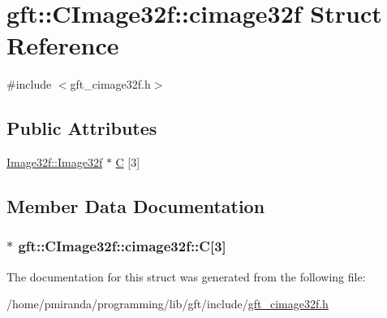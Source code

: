 \hypertarget{structgft_1_1CImage32f_1_1cimage32f}{}\section{gft\+:\+:C\+Image32f\+:\+:cimage32f Struct Reference}
\label{structgft_1_1CImage32f_1_1cimage32f}


{\ttfamily \#include $<$gft\+\_\+cimage32f.\+h$>$}

\subsection*{Public Attributes}
\begin{DoxyCompactItemize}
\item 
\hyperlink{namespacegft_1_1Image32f_a96206182c5fd3de436dfb4f87a1b49de}{Image32f\+::\+Image32f} $\ast$ \hyperlink{structgft_1_1CImage32f_1_1cimage32f_a40da7a1ec072bf63fae2e6fedecdf4da}{C} \mbox{[}3\mbox{]}
\end{DoxyCompactItemize}


\subsection{Member Data Documentation}
\subsubsection[{\texorpdfstring{C}{C}}]{$\ast$ gft\+::\+C\+Image32f\+::cimage32f\+::C\mbox{[}3\mbox{]}}\hypertarget{structgft_1_1CImage32f_1_1cimage32f_a40da7a1ec072bf63fae2e6fedecdf4da}{}\label{structgft_1_1CImage32f_1_1cimage32f_a40da7a1ec072bf63fae2e6fedecdf4da}


The documentation for this struct was generated from the following file\+:\begin{DoxyCompactItemize}
\item 
/home/pmiranda/programming/lib/gft/include/\hyperlink{gft__cimage32f_8h}{gft\+\_\+cimage32f.\+h}\end{DoxyCompactItemize}
